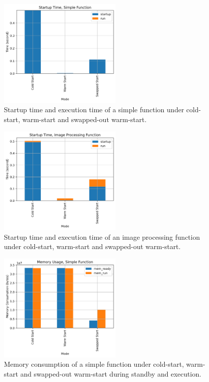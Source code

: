 \documentclass[conference]{IEEEtran}
\begin{document}
\begin{figure}
    \centering
    \includegraphics[width=6cm]{http_a.png}
    \caption{Startup time and execution time of a simple function under cold-start, warm-start and swapped-out warm-start.}
    \label{http_a}
\end{figure}
\begin{figure}
    \centering
    \includegraphics[width=6cm]{image_a.png}
    \caption{Startup time and execution time of an image processing function under cold-start, warm-start and swapped-out warm-start.}
    \label{image_a}
\end{figure}
\begin{figure}
    \centering
    \includegraphics[width=6cm]{http_b.png}
    \caption{Memory consumption of a simple function under cold-start, warm-start and swapped-out warm-start during standby and execution.}
    \label{http_b}
\end{figure}
\end{document}
